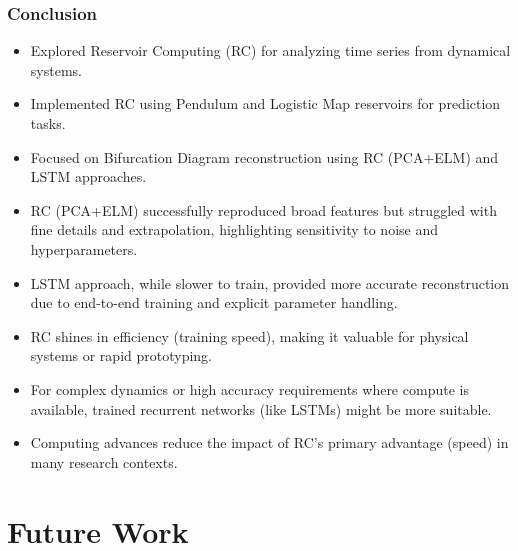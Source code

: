 \documentclass{beamer}
\begin{document}
\begin{frame}
    \frametitle{Conclusion}
    \begin{itemize}
        \item Explored Reservoir Computing (RC) for analyzing time series from dynamical systems.
        \item Implemented RC using Pendulum and Logistic Map reservoirs for prediction tasks.
        \item Focused on Bifurcation Diagram reconstruction using RC (PCA+ELM) and LSTM approaches.
        \item RC (PCA+ELM) successfully reproduced broad features but struggled with fine details and extrapolation, highlighting sensitivity to noise and hyperparameters.
        \item LSTM approach, while slower to train, provided more accurate reconstruction due to end-to-end training and explicit parameter handling.
        \item RC shines in efficiency (training speed), making it valuable for physical systems or rapid prototyping.
        \item For complex dynamics or high accuracy requirements where compute is available, trained recurrent networks (like LSTMs) might be more suitable.
        \item Computing advances reduce the impact of RC's primary advantage (speed) in many research contexts.
    \end{itemize}
\end{frame}

\section{Future Work}
\end{document}
